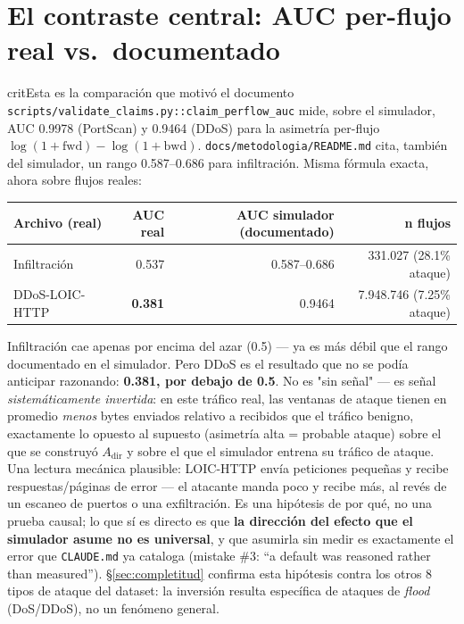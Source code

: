 \documentclass[11pt]{article}
\newcommand{\code}[1]{\texttt{\small #1}}
\begin{document}
\section{El contraste central: AUC per-flujo real vs.\ documentado}
\label{sec:contraste}

\begin{cbox}{crit}{Esta es la comparación que motivó el documento}
\code{scripts/validate\_claims.py::claim\_perflow\_auc} mide, sobre el simulador, AUC
0.9978 (PortScan) y 0.9464 (DDoS) para la asimetría per-flujo
$\log(1+\text{fwd}) - \log(1+\text{bwd})$. \code{docs/metodologia/README.md} cita,
también del simulador, un rango 0.587--0.686 para infiltración. Misma fórmula exacta,
ahora sobre flujos reales:
\end{cbox}

\begin{center}
\begin{tabular}{@{}lrrr@{}}
\toprule
\textbf{Archivo (real)} & \textbf{AUC real} & \textbf{AUC simulador (documentado)} & \textbf{n flujos} \\
\midrule
Infiltración & 0.537 & 0.587--0.686 & 331.027 (28.1\% ataque) \\
DDoS-LOIC-HTTP & \textbf{0.381} & 0.9464 & 7.948.746 (7.25\% ataque) \\
\bottomrule
\end{tabular}
\end{center}

Infiltración cae apenas por encima del azar (0.5) --- ya es más débil que el rango
documentado en el simulador. Pero DDoS es el resultado que no se podía anticipar
razonando: \textbf{0.381, por debajo de 0.5}. No es "sin señal" --- es señal
\emph{sistemáticamente invertida}: en este tráfico real, las ventanas de ataque tienen en
promedio \emph{menos} bytes enviados relativo a recibidos que el tráfico benigno, exactamente
lo opuesto al supuesto (asimetría alta = probable ataque) sobre el que se construyó
$A_{\text{dir}}$ y sobre el que el simulador entrena su tráfico de ataque. Una lectura
mecánica plausible: LOIC-HTTP envía peticiones pequeñas y recibe respuestas/páginas de
error --- el atacante manda poco y recibe más, al revés de un escaneo de puertos o una
exfiltración. Es una hipótesis de por qué, no una prueba causal; lo que sí es directo es
que \textbf{la dirección del efecto que el simulador asume no es universal}, y que
asumirla sin medir es exactamente el error que \code{CLAUDE.md} ya cataloga (mistake \#3:
``a default was reasoned rather than measured''). \S\ref{sec:completitud} confirma esta
hipótesis contra los otros 8 tipos de ataque del dataset: la inversión resulta específica
de ataques de \emph{flood} (DoS/DDoS), no un fenómeno general.
\end{document}
